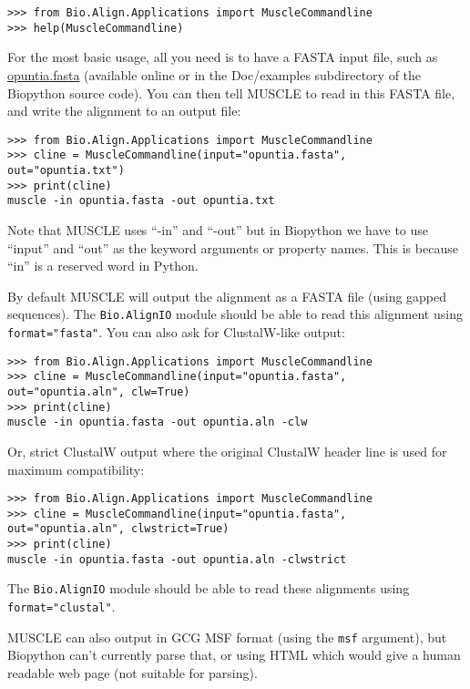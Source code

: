 \begin{verbatim}
>>> from Bio.Align.Applications import MuscleCommandline
>>> help(MuscleCommandline)
\end{verbatim}

For the most basic usage, all you need is to have a FASTA input file, such as
\href{https://raw.githubusercontent.com/biopython/biopython/master/Doc/examples/opuntia.fasta}{opuntia.fasta}
(available online or in the Doc/examples subdirectory of the Biopython source
code). You can then tell MUSCLE to read in this FASTA file, and write the
alignment to an output file:

\begin{verbatim}
>>> from Bio.Align.Applications import MuscleCommandline
>>> cline = MuscleCommandline(input="opuntia.fasta", out="opuntia.txt")
>>> print(cline)
muscle -in opuntia.fasta -out opuntia.txt
\end{verbatim}

Note that MUSCLE uses ``-in'' and ``-out'' but in Biopython we have to use
``input'' and ``out'' as the keyword arguments or property names. This is
because ``in'' is a reserved word in Python.

By default MUSCLE will output the alignment as a FASTA file (using gapped
sequences). The \verb|Bio.AlignIO| module should be able to read this
alignment using \texttt{format="fasta"}.
You can also ask for ClustalW-like output:

\begin{verbatim}
>>> from Bio.Align.Applications import MuscleCommandline
>>> cline = MuscleCommandline(input="opuntia.fasta", out="opuntia.aln", clw=True)
>>> print(cline)
muscle -in opuntia.fasta -out opuntia.aln -clw
\end{verbatim}

Or, strict ClustalW output where the original ClustalW header line is
used for maximum compatibility:

\begin{verbatim}
>>> from Bio.Align.Applications import MuscleCommandline
>>> cline = MuscleCommandline(input="opuntia.fasta", out="opuntia.aln", clwstrict=True)
>>> print(cline)
muscle -in opuntia.fasta -out opuntia.aln -clwstrict
\end{verbatim}

\noindent The \verb|Bio.AlignIO| module should be able to read these alignments
using \texttt{format="clustal"}.

MUSCLE can also output in GCG MSF format (using the \texttt{msf} argument), but
Biopython can't currently parse that, or using HTML which would give a human
readable web page (not suitable for parsing).


